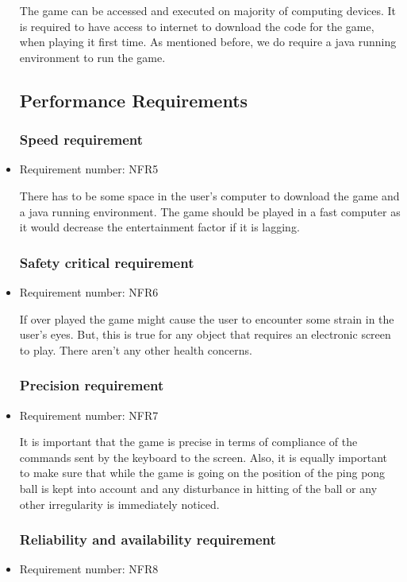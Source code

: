 \documentclass[12pt,letterpaper]{article}
\begin{document}
\begin{itemize}
	The game can be accessed and executed on majority of computing devices. It is required to have access to internet to download the code for the game, when playing it first time. As mentioned before, we do require a java running environment to run the game.

\subsection{Performance Requirements}
\subsubsection{Speed requirement}

\item Requirement number: NFR5

   	There has to be some space in the user’s computer to download the game and a java running environment. The game should be played in a fast computer as it would decrease the entertainment factor if it is lagging.
\subsubsection{Safety critical requirement}

\item Requirement number: NFR6

   	If over played the game might cause the user to encounter some strain in the user’s eyes. But, this is true for any object that requires an electronic screen to play. There aren’t any other health concerns.
\subsubsection{Precision requirement}

\item Requirement number: NFR7

   	It is important that the game is precise in terms of compliance of the commands sent by the keyboard to the screen. Also, it is equally important to make sure that while the game is going on the position of the ping pong ball is kept into account and any disturbance in hitting of the ball or any other irregularity is immediately noticed.
\subsubsection{Reliability and availability requirement}

\item Requirement number: NFR8


\end{itemize}
\end{document}
